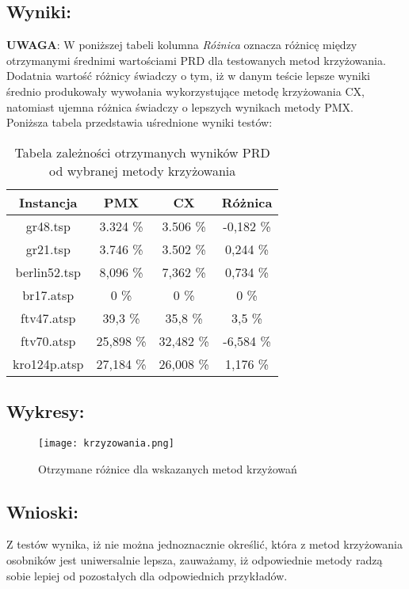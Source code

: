   \subsection{Wyniki: }
  \textbf{UWAGA}: W poniższej tabeli kolumna \textit{Różnica} oznacza różnicę między otrzymanymi średnimi wartościami PRD dla testowanych metod krzyżowania.
  Dodatnia wartość różnicy świadczy o tym, iż w danym teście lepsze wyniki średnio produkowały wywołania wykorzystujące metodę krzyżowania CX, natomiast 
  ujemna różnica świadczy o lepszych wynikach metody PMX. \\
    Poniższa tabela przedstawia uśrednione wyniki testów:
    \begin{table}[!ht]
      \centering
      \begin{tabular}{| c | c | c | c |}
        \hline
        Instancja & PMX & CX & Różnica \\
        \hline
        gr48.tsp & 3.324 \%& 3.506 \% & -0,182 \%\\
        gr21.tsp & 3.746 \%& 3.502 \%& 0,244 \%\\
        berlin52.tsp & 8,096 \%& 7,362 \% & 0,734 \%\\
        br17.atsp & 0 \%& 0 \%& 0 \%\\
        ftv47.atsp & 39,3 \%& 35,8 \%& 3,5 \%\\
        ftv70.atsp & 25,898 \%& 32,482 \%& -6,584 \%\\
        kro124p.atsp & 27,184 \%& 26,008 \%& 1,176 \%\\

        \hline
          
      \end{tabular}
      \caption{Tabela zależności otrzymanych wyników PRD od wybranej metody krzyżowania}
    \end{table}
  \subsection{Wykresy: }
  \begin{figure}[H]
    \texttt{[image: krzyzowania.png]}
    \centering
    \caption{Otrzymane różnice dla wskazanych metod krzyżowań}
  \end{figure}
  \subsection{Wnioski: }
    Z testów wynika, iż nie można jednoznacznie określić, która z metod krzyżowania osobników jest uniwersalnie lepsza, zauważamy, iż odpowiednie metody
    radzą sobie lepiej od pozostałych dla odpowiednich przykładów.
